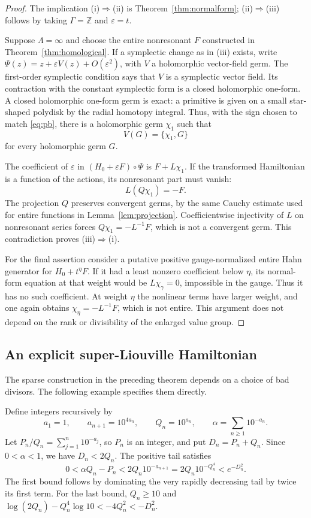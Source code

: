 \documentclass[11pt,letterpaper]{article}
\numberwithin{equation}{section}
\theoremstyle{definition}
\theoremstyle{remark}
\newcommand{\Z}{\mathbb Z}
\begin{document}
\begin{proof}
The implication (i)$\Rightarrow$(ii) is Theorem~\ref{thm:normalform};
(ii)$\Rightarrow$(iii) follows by taking $\Gamma=\Z$ and
$\varepsilon=t$.

Suppose $\Lambda=\infty$ and choose the entire nonresonant $F$ constructed
in Theorem~\ref{thm:homological}. If a symplectic change as in (iii) exists,
write $\Psi(z)=z+\varepsilon V(z)+O(\varepsilon^2)$, with $V$ a
holomorphic vector-field germ. The first-order symplectic condition says
that $V$ is a symplectic vector field. Its contraction with the constant
symplectic form is a closed holomorphic one-form. A closed holomorphic
one-form germ is exact: a primitive is given on a small star-shaped
polydisk by the radial homotopy integral. Thus, with the sign chosen to
match \eqref{eq:pb}, there is a holomorphic germ $\chi_1$ such that
\[
 V(G)=\{\chi_1,G\}
\]
for every holomorphic germ $G$.

The coefficient of $\varepsilon$ in
$(H_0+\varepsilon F)\circ\Psi$ is $F+L\chi_1$. If the transformed
Hamiltonian is a function of the actions, its nonresonant part must vanish:
\[
 L(Q\chi_1)=-F.
\]
The projection $Q$ preserves convergent germs, by the same Cauchy estimate
used for entire functions in Lemma~\ref{lem:projection}. Coefficientwise
injectivity of $L$ on nonresonant series forces
$Q\chi_1=-L^{-1}F$, which is not a convergent germ. This contradiction
proves (iii)$\Rightarrow$(i).

For the final assertion consider a putative positive gauge-normalized
entire Hahn generator for $H_0+t^\eta F$. If it had a least nonzero
coefficient below $\eta$, its normal-form equation at that weight would
be $L\chi_\gamma=0$, impossible in the gauge. Thus it has no such
coefficient. At weight $\eta$ the nonlinear terms have larger weight, and
one again obtains $\chi_\eta=-L^{-1}F$, which is not entire. This argument
does not depend on the rank or divisibility of the enlarged value group.
\end{proof}

\subsection{An explicit super-Liouville Hamiltonian}
The sparse construction in the preceding theorem depends on a choice of
bad divisors. The following example specifies them directly.

Define integers recursively by
\begin{equation}\label{eq:Liouv}
 a_1=1,\qquad a_{n+1}=10^{4a_n},\qquad Q_n=10^{a_n},\qquad
 \alpha=\sum_{n\ge1}10^{-a_n}.
\end{equation}
Let $P_n/Q_n=\sum_{j=1}^n10^{-a_j}$, so $P_n$ is an integer, and put
$D_n=P_n+Q_n$. Since $0<\alpha<1$, we have $D_n<2Q_n$.
The positive tail satisfies
\begin{equation}\label{eq:Liouvbound}
 0<\alpha Q_n-P_n
 <2Q_n10^{-a_{n+1}}
 =2Q_n10^{-Q_n^4}
 <e^{-D_n^2}.
\end{equation}
The first bound follows by dominating the very rapidly decreasing tail by
twice its first term. For the last bound, $Q_n\ge10$ and
$\log(2Q_n)-Q_n^4\log 10<-4Q_n^2<-D_n^2$.
\end{document}
